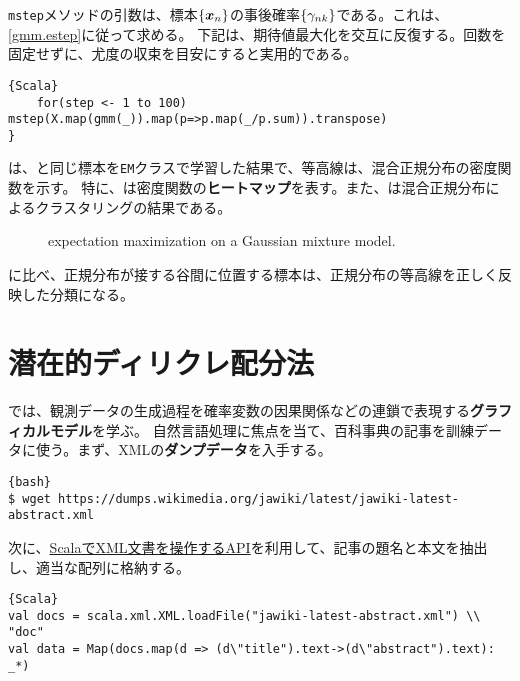 \documentclass[10pt,a4paper]{book}
\begin{document}
\texttt{mstep}メソッドの引数は、標本$\seq{\bm{x}_n}$の事後確率$\seq{\gamma_{nk}}$である。これは、\eqref{gmm.estep}に従って求める。
下記は、期待値最大化を交互に反復する。回数を固定せずに、尤度の収束を目安にすると実用的である。

\begin{Verbatim}{Scala}
	for(step <- 1 to 100) mstep(X.map(gmm(_)).map(p=>p.map(_/p.sum)).transpose)
}
\end{Verbatim}

は、と同じ標本を\texttt{EM}クラスで学習した結果で、等高線は、混合正規分布の密度関数を示す。
特に、は密度関数の\textbf{ヒートマップ}を表す。また、は混合正規分布によるクラスタリングの結果である。

\begin{figure}[h]
\centering
{}
\caption{expectation maximization on a Gaussian mixture model.\label{fig:gmm.train}}
\end{figure}

に比べ、正規分布が接する谷間に位置する標本は、正規分布の等高線を正しく反映した分類になる。

\chapter{潜在的ディリクレ配分法\label{chap:topic}}

では、観測データの生成過程を確率変数の因果関係などの連鎖で表現する\textbf{グラフィカルモデル}を学ぶ。
自然言語処理に焦点を当て、百科事典の記事を訓練データに使う。まず、XMLの\textbf{ダンプデータ}を入手する。

\begin{Verbatim}{bash}
$ wget https://dumps.wikimedia.org/jawiki/latest/jawiki-latest-abstract.xml
\end{Verbatim}

次に、\href{https://github.com/scala/scala-xml}{ScalaでXML文書を操作するAPI}を利用して、記事の題名と本文を抽出し、適当な配列に格納する。

\begin{Verbatim}{Scala}
val docs = scala.xml.XML.loadFile("jawiki-latest-abstract.xml") \\ "doc"
val data = Map(docs.map(d => (d\"title").text->(d\"abstract").text): _*)
\end{Verbatim}
\end{document}
